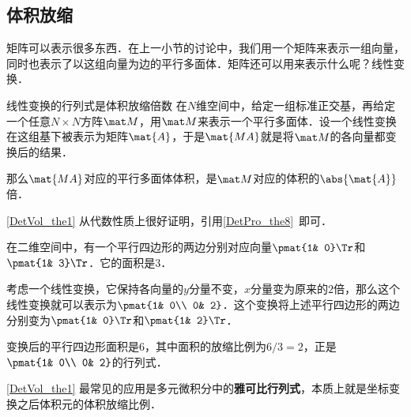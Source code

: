 


\subsection{体积放缩}

矩阵可以表示很多东西．在上一小节的讨论中，我们用一个矩阵来表示一组向量，同时也表示了以这组向量为边的平行多面体．矩阵还可以用来表示什么呢？线性变换．

\begin{theorem}{线性变换的行列式是体积放缩倍数}\label{DetVol_the1}
在$N$维空间中，给定一组标准正交基，再给定一个任意$N\times N$方阵$\mat M$，用$\mat M$来表示一个平行多面体．设一个线性变换在这组基下被表示为矩阵$\mat{A}$，于是$\mat{MA}$就是将$\mat M$的各向量都变换后的结果．

那么$\mat{MA}$对应的平行多面体体积，是$\mat M$对应的体积的$\abs{\mat{A}}$倍．
\end{theorem}

\autoref{DetVol_the1} 从代数性质上很好证明，引用\autoref{DetPro_the8}~即可．

\begin{example}{}
在二维空间中，有一个平行四边形的两边分别对应向量$\pmat{1& 0}\Tr$和$\pmat{1& 3}\Tr$．它的面积是$3$．

考虑一个线性变换，它保持各向量的$y$分量不变，$x$分量变为原来的$2$倍，那么这个线性变换就可以表示为$\pmat{1& 0\\ 0& 2}$．这个变换将上述平行四边形的两边分别变为$\pmat{1& 0}\Tr$和$\pmat{1& 2}\Tr$．

变换后的平行四边形面积是$6$，其中面积的放缩比例为$6/3=2$，正是$\pmat{1& 0\\ 0& 2}$的行列式．
\end{example}

\autoref{DetVol_the1} 最常见的应用是多元微积分中的\textbf{雅可比行列式}，本质上就是坐标变换之后体积元的体积放缩比例．



























